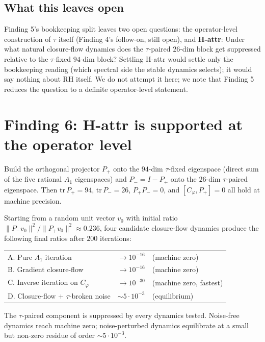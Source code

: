 \documentclass[11pt,a4paper]{article}
\newcommand{\Cphi}{C_\varphi}
\begin{document}
\subsection{What this leaves open}

Finding 5's bookkeeping split leaves two open questions: the
operator-level construction of $\tau$ itself (Finding 4's
follow-on, still open), and \textbf{H-attr}: Under what natural closure-flow
dynamics does the $\tau$-paired $26$-dim block get suppressed
relative to the $\tau$-fixed $94$-dim block? Settling H-attr
would settle only the bookkeeping reading (which spectral side the
stable dynamics selects); it would say nothing about RH itself.
We do not attempt it here; we note that Finding 5 reduces the
question to a definite operator-level statement.

\section{Finding 6: H-attr is supported at the operator level}
\label{sec:finding6}

\begin{findingbox}[title=Finding 6]
Build the orthogonal projector $P_+$ onto the $94$-dim
$\tau$-fixed eigenspace (direct sum of the five rational $A_1$
eigenspaces) and $P_- = I - P_+$ onto the $26$-dim $\tau$-paired
eigenspace. Then $\mathrm{tr}\,P_+ = 94$, $\mathrm{tr}\,P_- = 26$,
$P_+ P_- = 0$, and $[\Cphi, P_+] = 0$ all hold at machine
precision.

Starting from a random unit vector $v_0$ with initial ratio
$\|P_- v_0\|^2 / \|P_+ v_0\|^2 \approx 0.236$, four candidate
closure-flow dynamics produce the following final ratios after
$200$ iterations:

\begin{tabular}{lll}
A. Pure $A_1$ iteration             & $\to 10^{-16}$ & (machine zero) \\
B. Gradient closure-flow            & $\to 10^{-16}$ & (machine zero) \\
C. Inverse iteration on $\Cphi$     & $\to 10^{-30}$ & (machine zero, fastest) \\
D. Closure-flow $+$ $\tau$-broken noise & $\sim 5 \cdot 10^{-3}$ & (equilibrium) \\
\end{tabular}

\noindent
The $\tau$-paired component is suppressed by every dynamics
tested. Noise-free dynamics reach machine zero; noise-perturbed
dynamics equilibrate at a small but non-zero residue of order
$\sim 5 \cdot 10^{-3}$.
\end{findingbox}
\end{document}
